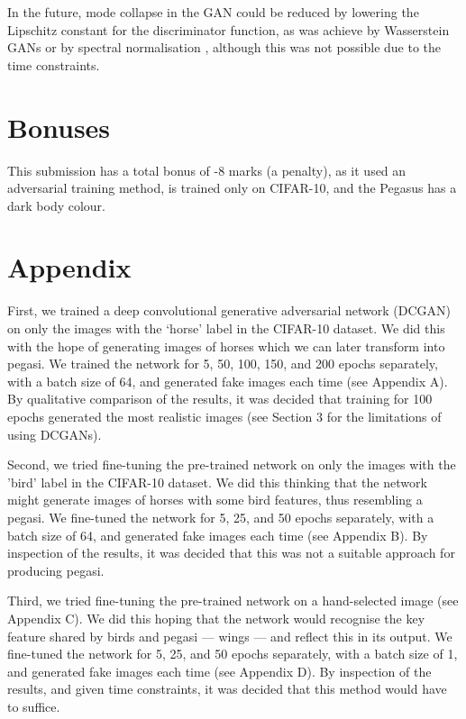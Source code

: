 \documentclass{article}
\begin{document}
In the future, mode collapse in the GAN could be reduced by lowering the Lipschitz constant for the discriminator function, as was achieve by Wasserstein GANs \cite{arjovsky2017wasserstein} or by spectral normalisation \cite{DBLP:journals/corr/abs-1802-05957}, although this was not possible due to the time constraints.

\section*{Bonuses}
This submission has a total bonus of -8 marks (a penalty), as it used an adversarial training method, is trained only on CIFAR-10, and the Pegasus has a dark body colour.

\section{Appendix}
First, we trained a deep convolutional generative adversarial network (DCGAN)~\cite{} on only the images with the `horse' label in the CIFAR-10 dataset. We did this with the hope of generating images of horses which we can later transform into pegasi. We trained the network for 5, 50, 100, 150, and 200 epochs separately, with a batch size of 64, and generated fake images each time (see Appendix A). By qualitative comparison of the results, it was decided that training for 100 epochs generated the most realistic images (see Section 3 for the limitations of using DCGANs).  

Second, we tried fine-tuning the pre-trained network on only the images with the 'bird' label in the CIFAR-10 dataset. We did this thinking that the network might generate images of horses with some bird features, thus resembling a pegasi. We fine-tuned the network for 5, 25, and 50 epochs separately, with a batch size of 64, and generated fake images each time (see Appendix B). By inspection of the results, it was decided that this was not a suitable approach for producing pegasi.  

Third, we tried fine-tuning the pre-trained network on a hand-selected image (see Appendix C). We did this hoping that the network would recognise the key feature shared by birds and pegasi --- wings --- and reflect this in its output. We fine-tuned the network for 5, 25, and 50 epochs separately, with a batch size of 1, and generated fake images each time (see Appendix D). By inspection of the results, and given time constraints, it was decided that this method would have to suffice.

\printbibliography
\end{document}
